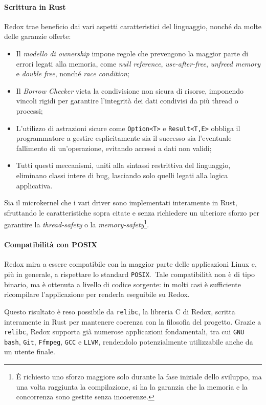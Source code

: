 \paragraph{Scrittura in Rust}
Redox trae beneficio dai vari aspetti caratteristici del linguaggio, nonché da molte delle garanzie offerte:
\begin{itemize}
    \item Il \textit{modello di ownership} impone regole che prevengono la maggior parte di errori legati alla memoria, come \textit{null reference}, \textit{use-after-free}, \textit{unfreed memory} e \textit{double free}, nonché \textit{race condition};
    \item Il \textit{Borrow Checker} vieta la condivisione non sicura di risorse, imponendo vincoli rigidi per garantire l'integrità dei dati condivisi da più thread o processi;
    \item L'utilizzo di astrazioni sicure come \texttt{Option<T>} e \texttt{Result<T,E>} obbliga il programmatore a gestire esplicitamente sia il successo sia l'eventuale fallimento di un'operazione, evitando accessi a dati non validi;
    \item Tutti questi meccanismi, uniti alla sintassi restrittiva del linguaggio, eliminano classi intere di bug, lasciando solo quelli legati alla logica applicativa.
\end{itemize}
Sia il microkernel che i vari driver sono implementati interamente in Rust, sfruttando le caratteristiche sopra citate e senza 
richiedere un ulteriore sforzo per garantire la \textit{thread-safety} o la \textit{memory-safety}\footnote{È richiesto uno sforzo maggiore solo durante la fase iniziale dello sviluppo, ma una volta raggiunta la compilazione, si ha la garanzia che la memoria e la concorrenza sono gestite senza incoerenze.}.

\paragraph{Compatibilità con POSIX}
Redox mira a essere compatibile con la maggior parte delle applicazioni Linux e, più in generale, a rispettare lo standard \texttt{POSIX}.\ 
Tale compatibilità non è di tipo binario, ma è ottenuta a livello di codice sorgente: in molti casi è sufficiente ricompilare l'applicazione per 
renderla eseguibile su Redox.

Questo risultato è reso possibile da \texttt{relibc}, la libreria C di Redox, scritta interamente in Rust per mantenere coerenza con la filosofia del progetto.
Grazie a \texttt{relibc}, Redox supporta già numerose applicazioni fondamentali, tra cui \texttt{GNU bash}, \texttt{Git}, \texttt{Ffmpeg}, \texttt{GCC} e \texttt{LLVM}, rendendolo
potenzialmente utilizzabile anche da un utente finale.

